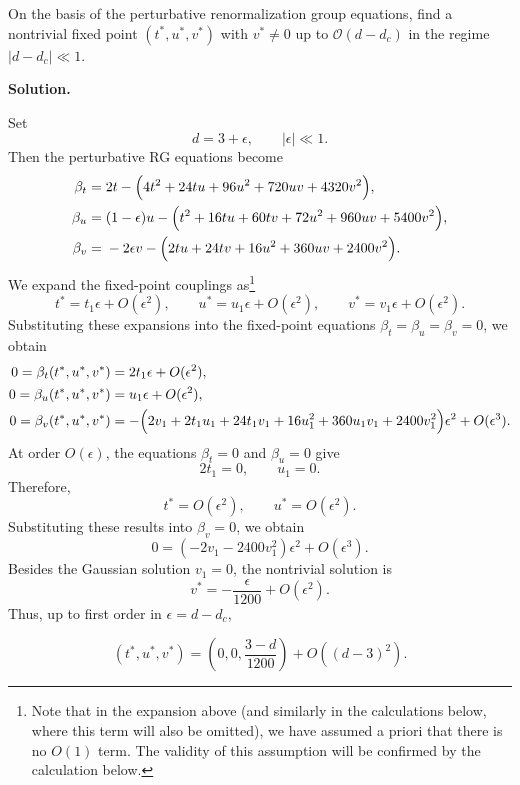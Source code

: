 \documentclass[11pt,a4paper]{article}
\newcounter{problem}
\newcounter{saveequation}
\newenvironment{solution}
{
	\par
	\setcounter{saveequation}{\value{equation}}
	\begingroup
	\setcounter{equation}{0}
	\renewcommand{\theequation}{\arabic{problem}.\arabic{equation}}
	\renewcommand{\theHequation}{sol.\arabic{problem}.\arabic{equation}}
	\noindent\textbf{Solution.}\quad
}
{
	\par
	\endgroup
	\setcounter{equation}{\value{saveequation}}
}
\begin{document}
	\begin{problembox}
		On the basis of the perturbative renormalization group equations, find a nontrivial fixed point $(t^*,u^*,v^*)$ with $v^*\neq 0$ up to $\mathcal{O}(d-d_c)$ in the regime $\lvert d-d_c\rvert\ll 1$.
	\end{problembox}
	\begin{solution}
			Set
			\[
			d=3+\epsilon,
			\qquad
			|\epsilon|\ll 1.
			\]
			Then the perturbative RG equations become
			\begin{equation}
				\begin{aligned}
					\beta_t
					={}&
					2t
					-\Bigl(
					4t^2+24tu+96u^2+720uv+4320v^2
					\Bigr),
					\\
					\beta_u
					={}&
					(1-\epsilon)u
					-\Bigl(
					t^2+16tu+60tv+72u^2+960uv+5400v^2
					\Bigr),
					\\
					\beta_v
					={}&
					-2\epsilon v
					-\Bigl(
					2tu+24tv+16u^2+360uv+2400v^2
					\Bigr).
				\end{aligned}
			\end{equation}
			We expand the fixed-point couplings as\footnote{Note that in the expansion above (and similarly in the calculations below, where this term will also be omitted), we have assumed a priori that there is no $O(1)$ term. The validity of this assumption will be confirmed by the calculation below.
			}
			\[
			t^*=t_1\epsilon+O(\epsilon^2),
			\qquad
			u^*=u_1\epsilon+O(\epsilon^2),
			\qquad
			v^*=v_1\epsilon+O(\epsilon^2).
			\]
			Substituting these expansions into the fixed-point equations
			$\beta_t=\beta_u=\beta_v=0$, we obtain
			\begin{align}
				0=\beta_t(t^*,u^*,v^*)
				&=
				2t_1\epsilon+O(\epsilon^2),
				\\
				0=\beta_u(t^*,u^*,v^*)
				&=
				u_1\epsilon+O(\epsilon^2),
				\\
				0=\beta_v(t^*,u^*,v^*)
				&=
				-\Bigl(
				2v_1
				+2t_1u_1
				+24t_1v_1
				+16u_1^2
				+360u_1v_1
				+2400v_1^2
				\Bigr)\epsilon^2
				+O(\epsilon^3).
			\end{align}
			At order $O(\epsilon)$, the equations $\beta_t=0$ and
			$\beta_u=0$ give
			\[
			2t_1=0,
			\qquad
			u_1=0.
			\]
			Therefore,
			\[
			t^*=O(\epsilon^2),
			\qquad
			u^*=O(\epsilon^2).
			\]
			Substituting these results into $\beta_v=0$, we obtain
			\begin{equation}
				0=\left(-2 v_1-2400 v_1^2\right)\epsilon^2+O(\epsilon^3).
			\end{equation}
			Besides the Gaussian solution $v_1=0$, the nontrivial solution is
			\[
			v^*=-\frac{\epsilon}{1200}+O(\epsilon^2).
			\]
			Thus, up to first order in $\epsilon=d-d_c$,
			\begin{finalanswer}
				\begin{equation}
					\label{fin:4}
					\boxed{
						(t^*,u^*,v^*)
						=
						\left(
						0,0,\frac{3-d}{1200}
						\right)
						+O\left((d-3)^2\right)
					}.
				\end{equation}
			\end{finalanswer}
	\end{solution}
\end{document}
